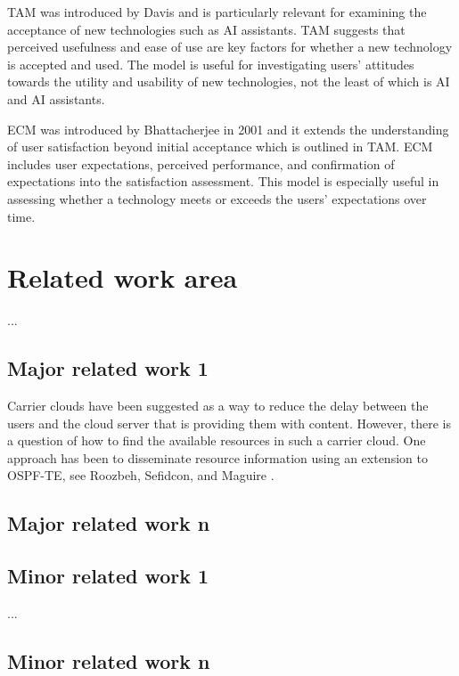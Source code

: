 \gls{TAM} was introduced by Davis \cite{davis_perceived_1989} and is particularly relevant for examining the acceptance of new technologies such as AI assistants. \gls{TAM} suggests that perceived usefulness and ease of use are key factors for whether a new technology is accepted and used. The model is useful for investigating users' attitudes towards the utility and usability of new technologies, not the least of which is AI and AI assistants.


\gls{ECM} was introduced by Bhattacherjee \cite{bhattacherjee_understanding_2001} in 2001 and it extends the understanding of user satisfaction beyond initial acceptance which is outlined in \gls{TAM}. \gls{ECM} includes user expectations, perceived performance, and confirmation of expectations into the satisfaction assessment. This model is especially useful in assessing whether a technology meets or exceeds the users' expectations over time.


\section{Related work area}




...




\subsection{Major related work 1}


Carrier clouds have been suggested as a way to reduce the delay between the users and the cloud server that is providing them with content. However, there is a question of how to find the available resources in such a carrier cloud. One approach has been to disseminate resource information using an extension to OSPF-TE, see Roozbeh, Sefidcon, and Maguire \cite{roozbeh_resource_2013}.


\subsection{Major related work n}


\subsection{Minor related work 1}


...


\subsection{Minor related work n}


